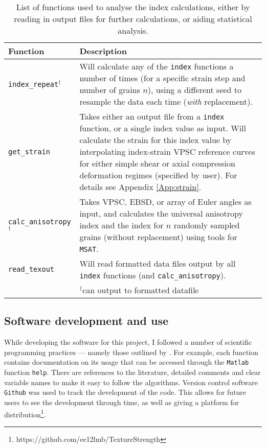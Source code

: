 \documentclass[a4paper,12pt,twoside]{report}
\numberwithin{equation}{chapter}
\begin{document}
\begin{table}[t] 
	\centering
	\caption[Functions: analysis]{List of functions used to analyse the index calculations, either by reading in output files for further calculations, or aiding statistical analysis.}
	\noindent
	
\begin{tabularx}{\textwidth}{lX}

\hline
\hline
Function    & Description   \\ 
\hline
\hline
\texttt{index\_{}repeat}$^{\dagger}$ & Will calculate any of the \texttt{index} functions a number of times (for a specific strain step and number of grains $n$), using a different seed to resample the data each time (\emph{with} replacement). \\

\texttt{get\_{}strain} & Takes either an output file from a \texttt{index} function, or a single index value as input. Will calculate the strain for this index value by interpolating index-strain VPSC reference curves for either simple shear or axial compression deformation regimes (specified by user). For details see Appendix \ref{App:strain}. \\

\texttt{calc\_{}anisotropy}$^\dagger$ & Takes VPSC, EBSD, or array of Euler angles as input, and calculates the universal anisotropy index and the \cite{Ledbetter2006} index for $n$ randomly sampled grains (without replacement) using tools for \texttt{MSAT}. \\

\texttt{read\_{}texout} & Will read formatted data files output by all \texttt{index} functions (and \texttt{calc\_{}anisotropy}). \\
\hline
{} & $^\dagger$can output to formatted datafile \\
\hline
\hline
\end{tabularx}
\label{tab:analysis_functions}
\end{table}

\subsection{Software development and use}

While developing the software for this project, I followed a number of scientific programming practices --- namely those outlined by \cite{Wilson2014}. For example, each function contains documentation on its usage that can be accessed through the \texttt{Matlab} function \texttt{help}. There are references to the literature, detailed comments and clear variable names to make it easy to follow the algorithms. Version control software \texttt{Github} was used to track the development of the code. This allows for future users to see the development through time, as well as giving a platform for distribution\footnote{https://github.com/ee12lmb/TextureStrength}.
\end{document}
